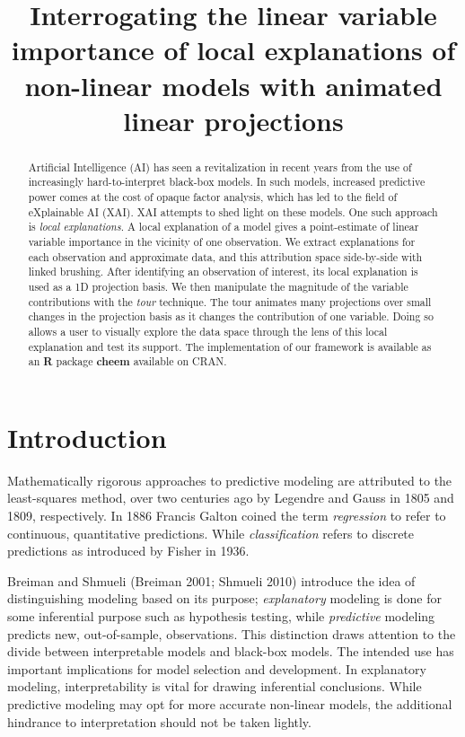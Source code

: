 \documentclass[
  article]{article}
\title{Interrogating the linear variable importance of local explanations of non-linear models with animated linear projections}
\author{}
\date{\vspace{-2.5em}}
\begin{document}
\maketitle
\begin{abstract}
Artificial Intelligence (AI) has seen a revitalization in recent years from the use of increasingly hard-to-interpret black-box models. In such models, increased predictive power comes at the cost of opaque factor analysis, which has led to the field of eXplainable AI (XAI). XAI attempts to shed light on these models. One such approach is \emph{local explanations}. A local explanation of a model gives a point-estimate of linear variable importance in the vicinity of one observation. We extract explanations for each observation and approximate data, and this attribution space side-by-side with linked brushing. After identifying an observation of interest, its local explanation is used as a 1D projection basis. We then manipulate the magnitude of the variable contributions with the \emph{tour} technique. The tour animates many projections over small changes in the projection basis as it changes the contribution of one variable. Doing so allows a user to visually explore the data space through the lens of this local explanation and test its support. The implementation of our framework is available as an \textbf{R} package \textbf{cheem} available on CRAN.
\end{abstract}

\hypertarget{sec:intro}{%
\section{Introduction}\label{sec:intro}}

Mathematically rigorous approaches to predictive modeling are attributed to the least-squares method, over two centuries ago by Legendre and Gauss in 1805 and 1809, respectively. In 1886 Francis Galton coined the term \emph{regression} to refer to continuous, quantitative predictions. While \emph{classification} refers to discrete predictions as introduced by Fisher in 1936.

Breiman and Shmueli (Breiman 2001; Shmueli 2010) introduce the idea of distinguishing modeling based on its purpose; \emph{explanatory} modeling is done for some inferential purpose such as hypothesis testing, while \emph{predictive} modeling predicts new, out-of-sample, observations. This distinction draws attention to the divide between interpretable models and black-box models. The intended use has important implications for model selection and development. In explanatory modeling, interpretability is vital for drawing inferential conclusions. While predictive modeling may opt for more accurate non-linear models, the additional hindrance to interpretation should not be taken lightly.
\end{document}
